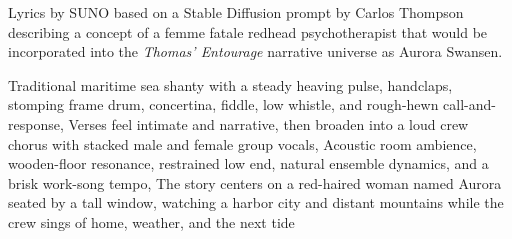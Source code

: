 
\begin{notes}
Lyrics by SUNO based on a Stable Diffusion prompt by Carlos Thompson describing a concept of a femme fatale redhead psychotherapist %
that would be incorporated into the \emph{Thomas’ Entourage} narrative universe as Aurora Swansen.
\end{notes}
\begin{style}
Traditional maritime sea shanty with a steady heaving pulse, handclaps, stomping frame drum, concertina, fiddle, low whistle, and rough-hewn call-and-response, Verses feel intimate and narrative, then broaden into a loud crew chorus with stacked male and female group vocals, Acoustic room ambience, wooden-floor resonance, restrained low end, natural ensemble dynamics, and a brisk work-song tempo, The story centers on a red-haired woman named Aurora seated by a tall window, watching a harbor city and distant mountains while the crew sings of home, weather, and the next tide
\end{style}
